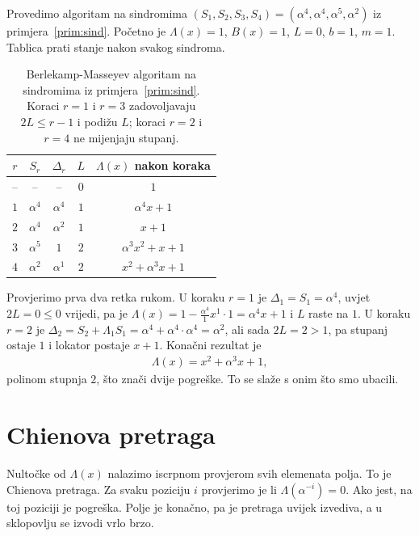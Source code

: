 \documentclass{mathos}
\begin{document}
\begin{primjer}\label{prim:lambda}
Provedimo algoritam na sindromima $(S_1, S_2, S_3, S_4) = (\alpha^4, \alpha^4, \alpha^5, \alpha^2)$ iz primjera~\ref{prim:sind}. Početno je $\Lambda(x) = 1$, $B(x) = 1$, $L = 0$, $b = 1$, $m = 1$. Tablica prati stanje nakon svakog sindroma.
\end{primjer}

\begin{table}[hbtp]
\centering
\begin{tabular}{|c|c|c|c|c|}\hline
$r$ & $S_r$ & $\Delta_r$ & $L$ & $\Lambda(x)$ nakon koraka \\\hline
-- & --       & --       & $0$ & $1$ \\\hline
$1$ & $\alpha^4$ & $\alpha^4$ & $1$ & $\alpha^4 x + 1$ \\\hline
$2$ & $\alpha^4$ & $\alpha^2$ & $1$ & $x + 1$ \\\hline
$3$ & $\alpha^5$ & $1$        & $2$ & $\alpha^3 x^2 + x + 1$ \\\hline
$4$ & $\alpha^2$ & $\alpha^1$ & $2$ & $x^2 + \alpha^3 x + 1$ \\\hline
\end{tabular}
\caption{Berlekamp-Masseyev algoritam na sindromima iz primjera~\ref{prim:sind}. Koraci $r=1$ i $r=3$ zadovoljavaju $2L \le r-1$ i podižu $L$; koraci $r=2$ i $r=4$ ne mijenjaju stupanj.}
\label{tab:bm}
\end{table}

\noindent
Provjerimo prva dva retka rukom. U koraku $r=1$ je $\Delta_1 = S_1 = \alpha^4$, uvjet $2L = 0 \le 0$ vrijedi, pa je $\Lambda(x) = 1 - \tfrac{\alpha^4}{1} x^1 \cdot 1 = \alpha^4 x + 1$ i $L$ raste na $1$. U koraku $r=2$ je $\Delta_2 = S_2 + \Lambda_1 S_1 = \alpha^4 + \alpha^4 \cdot \alpha^4 = \alpha^2$, ali sada $2L = 2 > 1$, pa stupanj ostaje $1$ i lokator postaje $x + 1$. Konačni rezultat je
\begin{align*}
    \Lambda(x) = x^2 + \alpha^3 x + 1,
\end{align*}
polinom stupnja $2$, što znači dvije pogreške. To se slaže s onim što smo ubacili.

\section{Chienova pretraga}

Nultočke od $\Lambda(x)$ nalazimo iscrpnom provjerom svih elemenata polja. To je Chienova pretraga. Za svaku poziciju $i$ provjerimo je li $\Lambda(\alpha^{-i}) = 0$. Ako jest, na toj poziciji je pogreška. Polje je konačno, pa je pretraga uvijek izvediva, a u sklopovlju se izvodi vrlo brzo.
\end{document}
